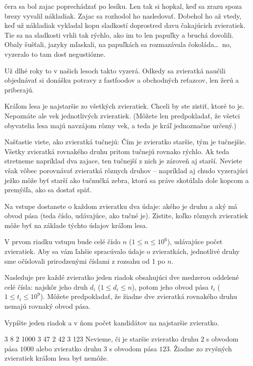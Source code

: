 




čera sa bol zajac poprechádzať po lesíku. Len tak si hopkal, keď sa zrazu spoza
brezy vyvalil nákladiak. Zajac sa rozhodol ho nasledovať. Dobehol ho až vtedy, keď už nákladiak
vykladal kopu sladkostí doprostred davu čakajúcich zvieratiek.
Tie sa na sladkosti vrhli tak rýchlo, ako im to len papuľky a bruchá dovolili.
Obaly šušťali, jazyky mľaskali, na papuľkách sa rozmazávala čokoláda\dots\ no, vyzeralo to
tam dosť negustiózne.

Už dlhé roky to v našich lesoch takto vyzerá. Odkedy sa zvieratká naučili objednávať si donášku
potravy z fastfoodov a obchodných reťazcov, len žerú a priberajú.


Kráľom lesa je najstaršie zo všetkých zvieratiek. Chceli by ste zistiť, ktoré to je.
Nepoznáte ale vek jednotlivých zvieratiek.
(Môžete len predpokladať, že všetci obyvatelia lesa majú navzájom rôzny vek, a teda je kráľ
jednoznačne určený.)

Našťastie viete, ako zvieratká tučnejú:
Čím je zvieratko staršie, tým je tučnejšie.
Všetky zvieratká rovnakého druhu pritom tučnejú rovnako rýchlo. Ak teda stretneme napríklad
dva zajace, ten tučnejší z nich je zároveň aj starší. Neviete však vôbec porovnávať zvieratká rôznych
druhov -- napríklad aj chudo vyzerajúci ježko môže byť starší ako tučnučká zebra, ktorá sa práve
skotúľala dole kopcom a premýšľa, ako sa dostať späť.

Na vstupe dostanete o každom zvieratku dva údaje: akého je druhu a aký má obvod pása (teda číslo, udávajúce, ako tučné je).
Zistite, koľko rôznych zvieratiek môže byť na základe týchto údajov kráľom lesa.




V prvom riadku vstupu bude celé číslo $n$ ($1\leq n\leq 10^6$), udávajúce počet zvieratiek.
Aby sa vám ľahšie spracúvalo údaje o zvieratkách, jednotlivé druhy sme očíslovali prirodzenými
číslami z rozsahu od 1 po $n$.

Nasleduje pre každé zvieratko jeden riadok obsahujúci dve medzerou oddelené celé čísla:
najskôr jeho druh $d_i$ ($1\leq d_i\leq n$), potom jeho obvod pása $t_i$ ($1\leq t_i\leq 10^9$).
Môžete predpokladať, že žiadne dve zvieratká rovnakého druhu nemajú rovnaký obvod pása.


Vypíšte jeden riadok a v ňom počet kandidátov na najstaršie zvieratko.


3 8
2 1000
3 47
2 42
3 123
\komentar
Nevieme, či je staršie zvieratko druhu $2$ s obvodom pása $1000$ alebo zvieratko druhu $3$ s obvodom
pása $123$. Žiadne zo zvyšných zvieratiek kráľom lesa byť nemôže.
\koniec


